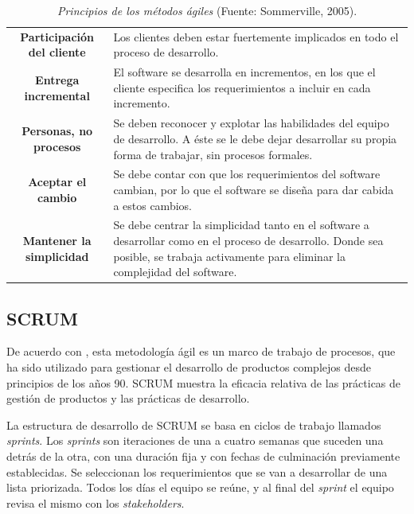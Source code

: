 	\begin{table}[t]
		\small
		\caption[Principios de los m\'{e}todos \'{a}giles]{\textit{Principios de los m\'{e}todos \'{a}giles} (Fuente: Sommerville, 2005).}
		\centering
		\setlength{\extrarowheight}{\altocelda}
		\begin{tabulary}{\anchotabla}{|c|J|}
			\hline
			 & \\ \hline
			\textbf{Participaci\'{o}n del cliente} & Los clientes deben estar fuertemente implicados en todo el proceso de desarrollo.\\ \hline
			\textbf{Entrega incremental} & El software se desarrolla en incrementos, en los que el cliente especifica los requerimientos a incluir en cada incremento.\\ \hline
			\textbf{Personas, no procesos} & Se deben reconocer y explotar las habilidades del equipo de desarrollo. A \'{e}ste se le debe dejar desarrollar su propia forma de trabajar, sin procesos formales.\\ \hline
			\textbf{Aceptar el cambio} & Se debe contar con que los requerimientos del software cambian, por lo que el software se dise\~{n}a para dar cabida a estos cambios.\\ \hline
			\textbf{Mantener la simplicidad} & Se debe centrar la simplicidad tanto en el software a desarrollar como en el proceso de desarrollo. Donde sea posible, se trabaja activamente para eliminar la complejidad del software.\\ \hline
		\end{tabulary}
	\end{table}

		\subsection{SCRUM}
De acuerdo con \cite{Schwaber&Sutherland}, esta metodolog\'{i}a \'{a}gil es un marco de trabajo de procesos, que ha sido utilizado para gestionar el desarrollo de productos complejos desde principios de los a\~{n}os 90. SCRUM muestra la eficacia relativa de las pr\'{a}cticas de gesti\'{o}n de productos y las pr\'{a}cticas de desarrollo.

La estructura de desarrollo de SCRUM se basa en ciclos de trabajo llamados \textit{sprints}. Los \textit{sprints} son iteraciones de una a cuatro semanas que suceden una detr\'{a}s de la otra, con una duraci\'{o}n fija y con fechas de culminaci\'{o}n previamente establecidas. Se seleccionan los requerimientos que se van a desarrollar de una lista priorizada. Todos los d\'{i}as el equipo se re\'{u}ne, y al final del \textit{sprint} el equipo revisa el mismo con los \textit{stakeholders}.

